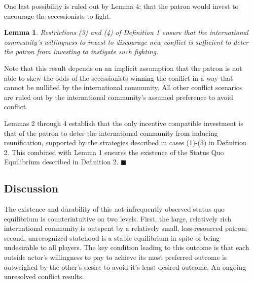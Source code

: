 \documentclass[11pt,letterpaper, notitlepage]{article}
\newtheorem{lemma}{Lemma}
\begin{document}
One last possibility is ruled out by Lemma 4: that the patron would invest to encourage the secessionists to fight. 

\begin{lemma}
Restrictions (3) and (4) of Definition 1 ensure that the international community's willingness to invest to discourage new conflict is sufficient to deter the patron from investing to instigate such fighting.
\end{lemma}

Note that this result depends on an implicit assumption that the patron is not able to skew the odds of the secessionists winning the conflict in a way that cannot be nullified by the international community. All other conflict scenarios are ruled out by the international community's assumed preference to avoid conflict.


Lemmas 2 through 4 establish that the only incentive compatible investment is that of the patron to deter the international community from inducing reunification, supported by the strategies described in cases (1)-(3) in Definition 2. This combined with Lemma 1 ensures the existence of the Status Quo Equilibrium described in Definition 2. \hfill $\blacksquare$

\subsection{Discussion}

The existence and durability of this not-infrequently observed status quo equilibrium is counterintuitive on two levels. First, the large, relatively rich international community is outspent by a relatively small, less-resourced patron; second, unrecognized statehood is a stable equilibrium in spite of being undesirable to all players. The key condition leading to this outcome is that each outside actor's willingness to pay to achieve its most preferred outcome is outweighed by the other's desire to avoid it's least desired outcome. An ongoing unresolved conflict results.
\end{document}
